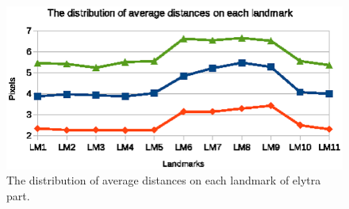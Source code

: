 \documentclass[review]{elsarticle}
\begin{document}
\begin{figure}[htbp]
	\centerline{\includegraphics[scale=0.55]{images/body_part}}
	\caption{The distribution of average distances on each landmark of elytra part.}
	\label{figdistelytra}
\end{figure}
\end{document}

